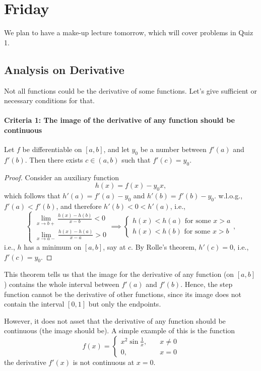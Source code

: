 

\section{Friday}
We plan to have a make-up lecture tomorrow, which will cover problems in Quiz 1.

\subsection{Analysis on Derivative}
Not all functions could be the derivative of some functions. Let's give sufficient or necessary conditions for that.
\paragraph{Criteria 1: The image of the derivative of any function should be continuous}
\begin{theorem}
Let $f$ be differentiable on $[a,b]$, and let $y_0$ be a number between $f'(a)$ and $f'(b)$. Then there exists $c\in(a,b)$ such that $f'(c) = y_0$.
\label{The:5:4}
\end{theorem}
\begin{proof}
Consider an auxiliary function
\[
h(x) = f(x) - y_0x,
\]
which follows that $h'(a) = f'(a) - y_0$ and $h'(b) = f'(b) - y_0$. w.l.o.g., $f'(a)<f'(b)$, and therefore $h'(b) < 0 < h'(a)$, i.e., 
\[
\left\{
\begin{array}{l}
\lim_{x\to b+}\frac{h(x)-h(b)}{x-b}<0\\
\lim_{x\to a-}\frac{h(x)-h(a)}{x-a}>0
\end{array}\right.\implies
\left\{
\begin{array}{l}
\mbox{$h(x)<h(a)$ for some $x>a$}\\
\mbox{$h(x) <h(b)$ for some $x>b$}
\end{array}\right.,
\]
i.e., $h$ has a minimum on $[a,b]$, say at $c$.
By Rolle's theorem, $h'(c)=0$, i.e., $f'(c) = y_0$.
\end{proof}
\begin{remark}
This theorem tells us that the image for the derivative of any function (on $[a,b]$) contains the whole interval between $f'(a)$ and $f'(b)$. Hence, the step function cannot be the derivative of other functions, since its image does not contain the interval $[0,1]$ but only the endpoints.
\end{remark}
However, it does not asset that the derivative of any function should be continuous (the image should be). A simple example of this is the function
\[
f(x)=\left\{
\begin{aligned}
x^2\sin\frac{1}{x},&\quad x\ne0\\
0,&\quad x=0
\end{aligned}
\right.
\]
the derivative $f'(x)$ is not continuous at $x=0$.

